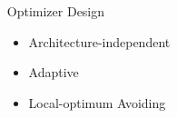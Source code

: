 \documentclass[final]{beamer}
\begin{document}
{\begin{frame}{}
\begin{center}
\begin{columns}[t]
\begin{column}{0.32\textwidth}
\vspace{1.2cm}

   
\end{column}

\begin{column}{0.32\textwidth}
 
    \begin{block}{\huge Optimizer Design}
\vspace{.5cm}

\begin{itemize}
\item Architecture-independent

\item Adaptive

\item Local-optimum Avoiding
\end{itemize}

\begin{center}
\begin{figure}
\end{figure}
\end{center}



\end{block}
\end{column}
\end{columns}
\end{center}
\end{frame}}
\end{document}
